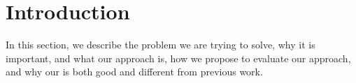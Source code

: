 \section{Introduction}
\label{sec:intro}
In this section, we describe the problem we are trying to solve, why
it is important, and what our approach is, how we propose to evaluate
our approach, and why our is both good and different from previous work.